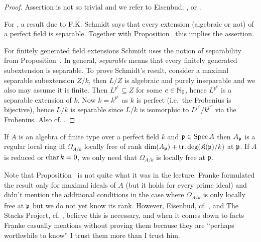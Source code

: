 \documentclass[a4paper,parskip=half,numbers=enddot, DIV=12, headheight=30pt]{scrreprt}
\begin{document}
\begin{proof}
	Assertion  is not so trivial and we refer to Eisenbud, \cite[Corollary~16.17]{eisenbudCommAlg}, or \cite[Proposition~5.6]{kunzKahler}.
	
	For , a result due to F.K. Schmidt says that every extension (algebraic or not) of a perfect field is separable. Together with Proposition~ this implies the assertion. 
	
	For finitely generated field extensions Schmidt uses the notion of separability from Proposition~. In general, \emph{separable} means that every finitely generated subextension is separable. To prove Schmidt's result, consider a maximal separable subextension $Z/k$, then $L/Z$ is algebraic and purely inseparable and we also may assume it is finite. Then $L^{p^e}\subseteq Z$ for some $e\in\mathbb{N}_0$, hence $L^{p^e}$ is a separable extension of $k$. Now $k=k^{p^e}$ as $k$ is perfect (i.e.\ the Frobenius is bijective), hence $L/k$ is separable since $L/k$ is isomorphic to $L^{p^e}/k^{p^e}$ via the Frobenius. Also cf. \cite[Proposition~5.18]{kunzKahler}.
\end{proof}
\begin{prop}
    If $A$ is an algebra of finite type over a perfect field $k$ and $\mathfrak{p}\in\operatorname{Spec} A$ then $A_{\mathfrak{p}}$ is a regular local ring iff $\Omega_{A/k}$ locally free of rank $\dim(A_{\mathfrak{p}})+\operatorname{tr.deg}(\mathfrak{K}(\mathfrak{p})/k)$ at $\mathfrak{p}$. If $A$ is reduced or $\operatorname{char} k=0$, we only need that $\Omega_{A/k}$ is locally free at $\mathfrak{p}$.
\end{prop}
\begin{rem*}
	Note that Proposition~ is not quite what it was in the lecture.  Franke formulated the result only for maximal ideals of $A$ (but it holds for every prime ideal) and didn't mention the additional conditions in the case where $\Omega_{A/k}$ is only locally free at $\mathfrak{p}$ but we do not yet know its rank. However, Eisenbud, cf. \cite[Corollary~16.22]{eisenbudCommAlg}, and The Stacks Project, cf. \cite[Tag~00TX]{stacks-project}, believe this is necessary, and when it comes down to facts Franke casually mentions without proving them because they are ``perhaps worthwhile to know'' I trust them more than I trust him.
\end{rem*}
\end{document}
